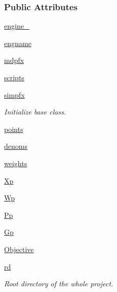 \subsubsection*{Public Attributes}
\begin{DoxyCompactItemize}
\item 
\hyperlink{classforcebalance_1_1gmxio_1_1Thermo__GMX_a93586a1e68e1e976d335834ca2652fe3}{engine\-\_\-}
\item 
\hyperlink{classforcebalance_1_1gmxio_1_1Thermo__GMX_a49479ee959d2ccf86d867d4a79606414}{engname}
\item 
\hyperlink{classforcebalance_1_1gmxio_1_1Thermo__GMX_ab6b939f5a13df184d1bc513ede51b798}{mdpfx}
\item 
\hyperlink{classforcebalance_1_1gmxio_1_1Thermo__GMX_aade2d7eab971d8980afd20f52f5311c9}{scripts}
\item 
\hyperlink{classforcebalance_1_1thermo_1_1Thermo_ab0c5f73c4c9812e2d733ffb0f65edeb9}{simpfx}
\begin{DoxyCompactList}\small\item\em Initialize base class. \end{DoxyCompactList}\item 
\hyperlink{classforcebalance_1_1thermo_1_1Thermo_a026babae21684ddf5751cf17a91c5588}{points}
\item 
\hyperlink{classforcebalance_1_1thermo_1_1Thermo_a2cfee647c0b5b8dd9f575d3a5d0b7d88}{denoms}
\item 
\hyperlink{classforcebalance_1_1thermo_1_1Thermo_a2821e61578dac23a40db4788abacda0f}{weights}
\item 
\hyperlink{classforcebalance_1_1thermo_1_1Thermo_a5d5c7cfd9aa3bbd85ff15cb476ba990b}{Xp}
\item 
\hyperlink{classforcebalance_1_1thermo_1_1Thermo_ace1a9dd4cc6b80f40a10d56309b30a01}{Wp}
\item 
\hyperlink{classforcebalance_1_1thermo_1_1Thermo_a542d45d19d3ac48f3c7f25c00fd9d839}{Pp}
\item 
\hyperlink{classforcebalance_1_1thermo_1_1Thermo_a2c052c89904a57ae487c1ff082e3f023}{Gp}
\item 
\hyperlink{classforcebalance_1_1thermo_1_1Thermo_ad0f733fe26b94c3d7b632d7257c91e78}{Objective}
\item 
\hyperlink{classforcebalance_1_1target_1_1Target_a4edb69fbde792e9f2f27e54b7c978c8e}{rd}
\begin{DoxyCompactList}\small\item\em Root directory of the whole project. \end{DoxyCompactList}\item 

\end{DoxyCompactItemize}

